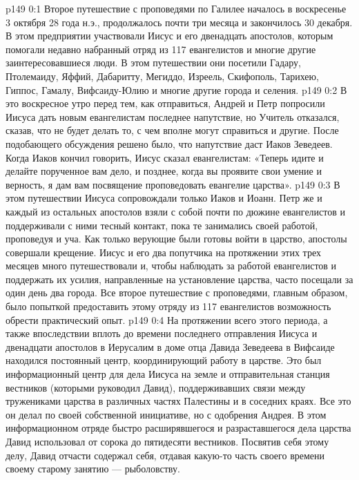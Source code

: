 \author{Комиссия срединников}
\vs p149 0:1 Второе путешествие с проповедями по Галилее началось в воскресенье 3 октября 28 года н.э., продолжалось почти три месяца и закончилось 30 декабря. В этом предприятии участвовали Иисус и его двенадцать апостолов, которым помогали недавно набранный отряд из 117 евангелистов и многие другие заинтересовавшиеся люди. В этом путешествии они посетили Гадару, Птолемаиду, Яффий, Дабаритту, Мегиддо, Изреель, Скифополь, Тарихею, Гиппос, Гамалу, Вифсаиду\hyp{}Юлию и многие другие города и селения.
\vs p149 0:2 В это воскресное утро перед тем, как отправиться, Андрей и Петр попросили Иисуса дать новым евангелистам последнее напутствие, но Учитель отказался, сказав, что не будет делать то, с чем вполне могут справиться и другие. После подобающего обсуждения решено было, что напутствие даст Иаков Зеведеев. Когда Иаков кончил говорить, Иисус сказал евангелистам: «Теперь идите и делайте порученное вам дело, и позднее, когда вы проявите свои умение и верность, я дам вам посвящение проповедовать евангелие царства».
\vs p149 0:3 В этом путешествии Иисуса сопровождали только Иаков и Иоанн. Петр же и каждый из остальных апостолов взяли с собой почти по дюжине евангелистов и поддерживали с ними тесный контакт, пока те занимались своей работой, проповедуя и уча. Как только верующие были готовы войти в царство, апостолы совершали крещение. Иисус и его два попутчика на протяжении этих трех месяцев много путешествовали и, чтобы наблюдать за работой евангелистов и поддержать их усилия, направленные на установление царства, часто посещали за один день два города. Все второе путешествие с проповедями, главным образом, было попыткой предоставить этому отряду из 117 евангелистов возможность обрести практический опыт.
\vs p149 0:4 \pc На протяжении всего этого периода, а также впоследствии вплоть до времени последнего отправления Иисуса и двенадцати апостолов в Иерусалим в доме отца Давида Зеведеева в Вифсаиде находился постоянный центр, координирующий работу в царстве. Это был информационный центр для дела Иисуса на земле и отправительная станция вестников (которыми руководил Давид), поддерживавших связи между тружениками царства в различных частях Палестины и в соседних краях. Все это он делал по своей собственной инициативе, но с одобрения Андрея. В этом информационном отряде быстро расширявшегося и разраставшегося дела царства Давид использовал от сорока до пятидесяти вестников. Посвятив себя этому делу, Давид отчасти содержал себя, отдавая какую\hyp{}то часть своего времени своему старому занятию --- рыболовству.
